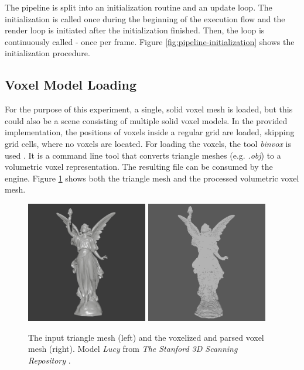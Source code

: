 \noindent
The pipeline is split into an initialization routine and an update loop. The initialization is called once during 
the beginning of the execution flow and the render loop is initiated after the initialization finished. Then, the 
loop is continuously called - once per frame. Figure \ref{fig:pipeline-initialization} shows the initialization 
procedure. 

\subsection*{Voxel Model Loading} \label{subsec-voxel-model-loading}

For the purpose of this experiment, a single, solid voxel mesh is loaded, but this could also be a scene 
consisting of multiple solid voxel models. In the provided implementation, the positions of voxels inside a regular 
grid are loaded, skipping grid cells, where no voxels are located. For loading the voxels, the tool \emph{binvox} 
is used \cite{binvox, Nooruddin2003}. It is a command line tool that converts triangle meshes (e.g. \emph{.obj}) to 
a volumetric voxel representation. The resulting file can be consumed by the engine. Figure 
\ref{fig:trimesh-to-voxel-mesh} shows both the triangle mesh and the processed volumetric voxel mesh. 

\begin{figure}[h]
    \centering
    \includegraphics[width=200px]{images/graphics/lucy-triangle-mesh.jpg}
    \includegraphics[width=200px]{images/graphics/lucy-voxel-mesh.jpg}
    \caption{The input triangle mesh (left) and the voxelized and parsed voxel mesh (right). 
    Model \emph{Lucy} from \emph{The Stanford 3D Scanning Repository} \cite{Stanford23}.}
    \label{fig:trimesh-to-voxel-mesh}
\end{figure}


